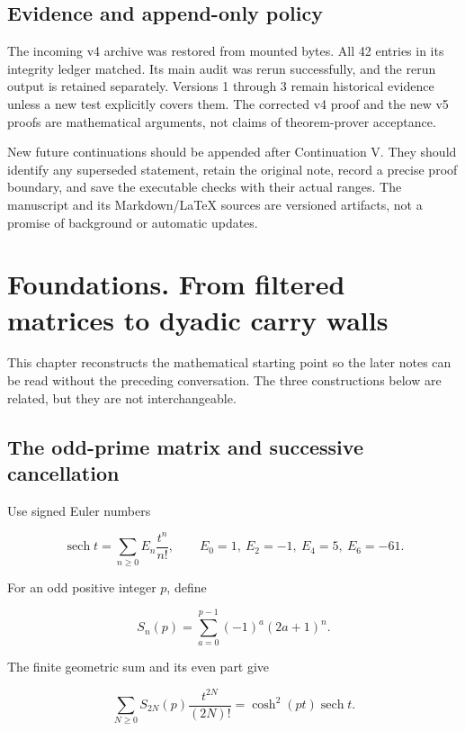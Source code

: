 \documentclass[11pt,letterpaper]{article}
\begin{document}
\subsection{Evidence and append-only policy}\label{evidence-and-append-only-policy}

The incoming v4 archive was restored from mounted bytes. All 42 entries in its integrity ledger matched. Its main audit was rerun successfully, and the rerun output is retained separately. Versions 1 through 3 remain historical evidence unless a new test explicitly covers them. The corrected v4 proof and the new v5 proofs are mathematical arguments, not claims of theorem-prover acceptance.

New future continuations should be appended after Continuation V. They should identify any superseded statement, retain the original note, record a precise proof boundary, and save the executable checks with their actual ranges. The manuscript and its Markdown/LaTeX sources are versioned artifacts, not a promise of background or automatic updates.

\clearpage

\section{Foundations. From filtered matrices to dyadic carry walls}\label{foundations.-from-filtered-matrices-to-dyadic-carry-walls}

This chapter reconstructs the mathematical starting point so the later notes can be read without the preceding conversation. The three constructions below are related, but they are not interchangeable.

\subsection{The odd-prime matrix and successive cancellation}\label{the-odd-prime-matrix-and-successive-cancellation}

Use signed Euler numbers

\[
\operatorname{sech}t=\sum_{n\ge0}E_n\frac{t^n}{n!},
\qquad E_0=1,\ E_2=-1,\ E_4=5,\ E_6=-61.
\]

For an odd positive integer \(p\), define

\[
S_n(p)=\sum_{a=0}^{p-1}(-1)^a(2a+1)^n.
\]

The finite geometric sum and its even part give

\[
\sum_{N\ge0}S_{2N}(p)\frac{t^{2N}}{(2N)!}
=\cosh^2(pt)\operatorname{sech}t.
\]
\end{document}
